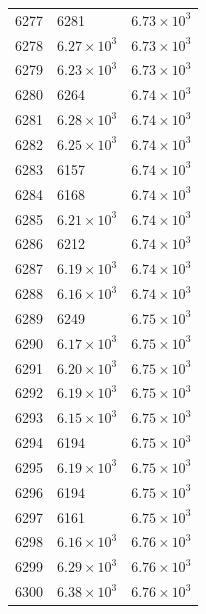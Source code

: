\begin{table}[H]
\begin{tabular}{lll}
6277 & 6281 & $\displaystyle 6.73 \times 10^{3}$ \\
6278 & $\displaystyle 6.27 \times 10^{3}$ & $\displaystyle 6.73 \times 10^{3}$ \\
6279 & $\displaystyle 6.23 \times 10^{3}$ & $\displaystyle 6.73 \times 10^{3}$ \\
6280 & 6264 & $\displaystyle 6.74 \times 10^{3}$ \\
6281 & $\displaystyle 6.28 \times 10^{3}$ & $\displaystyle 6.74 \times 10^{3}$ \\
6282 & $\displaystyle 6.25 \times 10^{3}$ & $\displaystyle 6.74 \times 10^{3}$ \\
6283 & 6157 & $\displaystyle 6.74 \times 10^{3}$ \\
6284 & 6168 & $\displaystyle 6.74 \times 10^{3}$ \\
6285 & $\displaystyle 6.21 \times 10^{3}$ & $\displaystyle 6.74 \times 10^{3}$ \\
6286 & 6212 & $\displaystyle 6.74 \times 10^{3}$ \\
6287 & $\displaystyle 6.19 \times 10^{3}$ & $\displaystyle 6.74 \times 10^{3}$ \\
6288 & $\displaystyle 6.16 \times 10^{3}$ & $\displaystyle 6.74 \times 10^{3}$ \\
6289 & 6249 & $\displaystyle 6.75 \times 10^{3}$ \\
6290 & $\displaystyle 6.17 \times 10^{3}$ & $\displaystyle 6.75 \times 10^{3}$ \\
6291 & $\displaystyle 6.20 \times 10^{3}$ & $\displaystyle 6.75 \times 10^{3}$ \\
6292 & $\displaystyle 6.19 \times 10^{3}$ & $\displaystyle 6.75 \times 10^{3}$ \\
6293 & $\displaystyle 6.15 \times 10^{3}$ & $\displaystyle 6.75 \times 10^{3}$ \\
6294 & 6194 & $\displaystyle 6.75 \times 10^{3}$ \\
6295 & $\displaystyle 6.19 \times 10^{3}$ & $\displaystyle 6.75 \times 10^{3}$ \\
6296 & 6194 & $\displaystyle 6.75 \times 10^{3}$ \\
6297 & 6161 & $\displaystyle 6.75 \times 10^{3}$ \\
6298 & $\displaystyle 6.16 \times 10^{3}$ & $\displaystyle 6.76 \times 10^{3}$ \\
6299 & $\displaystyle 6.29 \times 10^{3}$ & $\displaystyle 6.76 \times 10^{3}$ \\
6300 & $\displaystyle 6.38 \times 10^{3}$ & $\displaystyle 6.76 \times 10^{3}$ \\

\end{tabular}
\end{table}
